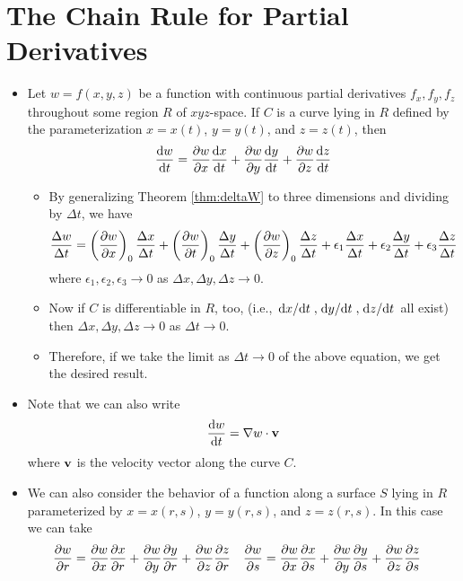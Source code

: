 \documentclass[../main.tex]{subfiles}
\begin{document}
\section{The Chain Rule for Partial Derivatives}
\begin{itemize}
    \item Let $w=f(x,y,z)$ be a function with continuous partial derivatives $f_x,f_y,f_z$ throughout some region $R$ of $xyz$-space. If $C$ is a curve lying in $R$ defined by the parameterization $x=x(t)$, $y=y(t)$, and $z=z(t)$, then
    \begin{equation*}
        \dv{w}{t} = \pdv{w}{x}\dv{x}{t}+\pdv{w}{y}\dv{y}{t}+\pdv{w}{z}\dv{z}{t}
    \end{equation*}
    \begin{itemize}
        \item By generalizing Theorem \ref{thm:deltaW} to three dimensions and dividing by $\Delta t$, we have
        \begin{equation*}
            \frac{\Delta w}{\Delta t} = \left( \pdv{w}{x} \right)_0\frac{\Delta x}{\Delta t}+\left( \pdv{w}{t} \right)_0\frac{\Delta y}{\Delta t}+\left( \pdv{w}{z} \right)_0\frac{\Delta z}{\Delta t}+\epsilon_1\frac{\Delta x}{\Delta t}+\epsilon_2\frac{\Delta y}{\Delta t}+\epsilon_3\frac{\Delta z}{\Delta t}
        \end{equation*}
        where $\epsilon_1,\epsilon_2,\epsilon_3\to 0$ as $\Delta x,\Delta y,\Delta z\to 0$.
        \item Now if $C$ is differentiable in $R$, too, (i.e., $\dv*{x}{t},\dv*{y}{t},\dv*{z}{t}$ all exist) then $\Delta x,\Delta y,\Delta z\to 0$ as $\Delta t\to 0$.
        \item Therefore, if we take the limit as $\Delta t\to 0$ of the above equation, we get the desired result.
    \end{itemize}
    \item Note that we can also write
    \begin{equation*}
        \dv{w}{t} = \nabla w\cdot\vb{v}
    \end{equation*}
    where $\vb{v}$ is the velocity vector along the curve $C$.
    \item We can also consider the behavior of a function along a surface $S$ lying in $R$ parameterized by $x=x(r,s)$, $y=y(r,s)$, and $z=z(r,s)$. In this case we can take
    \begin{align*}
        \pdv{w}{r} &= \pdv{w}{x}\pdv{x}{r}+\pdv{w}{y}\pdv{y}{r}+\pdv{w}{z}\pdv{z}{r}&
            \pdv{w}{s} &= \pdv{w}{x}\pdv{x}{s}+\pdv{w}{y}\pdv{y}{s}+\pdv{w}{z}\pdv{z}{s}
    \end{align*}
    \begin{itemize}

\end{itemize}
\end{itemize}
\end{document}
